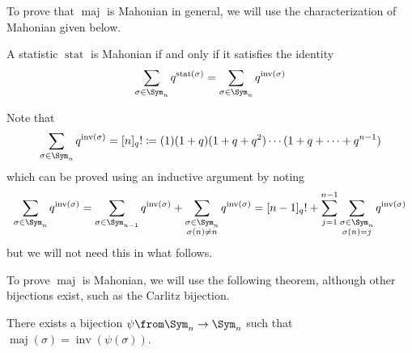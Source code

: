 \documentclass[11pt,leqno,oneside]{amsart}
\numberwithin{thm}{section}
\newcommand{\inv}{\operatorname{inv}}
\newcommand{\defeq}{\coloneqq}
\newcommand{\stat}{\operatorname{stat}}
\newcommand{\maj}{\operatorname{maj}}
\begin{document}
To prove that \(\maj\) is Mahonian in general, we will use the
characterization of Mahonian given below.
\begin{thm}
  A statistic \(\stat\) is Mahonian if and only if it satisfies the
  identity \[
    \sum_{\sigma \in \Sym_n} q^{\stat(\sigma)} = \sum_{\sigma \in
      \Sym_n} q^{\inv(\sigma)}
  \]
\end{thm}
\begin{rmk}
  Note that \[
    \sum_{\sigma \in \Sym_n} q^{\inv(\sigma)} = [n]_q! \defeq
    (1)(1+q)(1+q+q^2)\cdots (1+q+\cdots+q^{n-1})
  \]
  which can be proved using an inductive argument by noting \[
    \sum_{\sigma \in \Sym_n} q^{\inv(\sigma)} = \sum_{\sigma \in
      \Sym_{n-1}} q^{\inv(\sigma)} + \sum_{\substack{\sigma \in \Sym_n
      \\ \sigma(n) \neq n}} q^{\inv(\sigma)} = [n-1]_q! +
  \sum_{j=1}^{n-1} \sum_{\substack{\sigma \in \Sym_n \\ \sigma(n)=j}} q^{\inv(\sigma)}
  \]
  but we will not need this in what follows.
\end{rmk}
To prove \(\maj\) is Mahonian, we will use the following theorem,
although other bijections exist, such as the Carlitz bijection.
\begin{thm}
  There exists a bijection \(\psi \from \Sym_n \to \Sym_n\) such that
  \(\maj(\sigma) = \inv(\psi(\sigma))\).
\end{thm}
\end{document}
